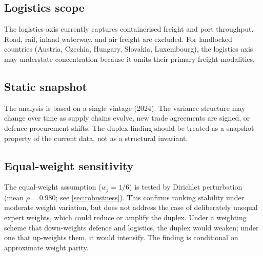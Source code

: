 \subsection{Logistics scope}

The logistics axis currently captures containerised freight and port
throughput.  Road, rail, inland waterway, and air freight are
excluded.  For landlocked countries (Austria, Czechia, Hungary,
Slovakia, Luxembourg), the logistics axis may understate
concentration because it omits their primary freight modalities.

\subsection{Static snapshot}

The analysis is based on a single vintage (2024).  The variance
structure may change over time as supply chains evolve, new trade
agreements are signed, or defence procurement shifts.  The duplex
finding should be treated as a snapshot property of the current
data, not as a structural invariant.

\subsection{Equal-weight sensitivity}

The equal-weight assumption ($w_j = 1/6$) is tested by Dirichlet
perturbation (mean $\rho = 0.980$; see \cref{sec:robustness}).
This confirms ranking stability under moderate weight variation,
but does not address the case of deliberately unequal expert
weights, which could reduce or amplify the duplex.  Under a
weighting scheme that down-weights defence and logistics, the
duplex would weaken; under one that up-weights them, it would
intensify.  The finding is conditional on approximate weight parity.
